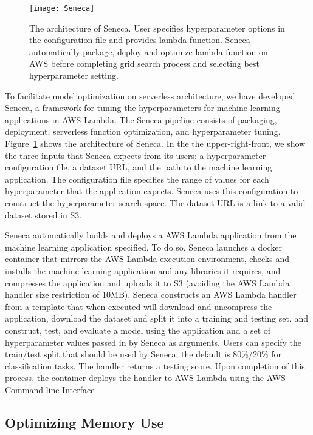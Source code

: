 \begin{figure}[t] \centering 
\texttt{[image: Seneca]}
\caption{The architecture of Seneca. 
User specifies hyperparameter options in the configuration file and provides lambda function. Seneca automatically package, deploy and optimize lambda function on AWS before completing grid search process and selecting best hyperparameter setting.
\label{fig:seneca}}
\end{figure}

To facilitate model optimization on serverless architecture, we have developed Seneca, 
a framework for tuning the hyperparameters for machine learning applications 
in AWS Lambda. 
The Seneca pipeline consists of packaging, deployment, serverless 
function optimization, and hyperparameter tuning. Figure~\ref{fig:seneca} 
shows the architecture of Seneca.  In the the upper-right-front, we
show the three inputs that Seneca expects from its users: a hyperparameter
configuration file, a dataset URL, and the path to 
the machine learning application.
The configuration file
specifies the range of values for each hyperparameter that the 
application expects.  Seneca uses this configuration to construct
the hyperparameter search space.  The dataset URL is a link to a
valid dataset stored in S3.  

Seneca automatically builds and deploys a AWS Lambda application
from the machine learning application specified.
To do so, Seneca launches a docker container that mirrors the
AWS Lambda execution environment, checks and installs
the machine learning application and any libraries it requires,
and compresses the application and uploads it to S3 (avoiding
the AWS Lambda handler size restriction of 10MB).
Seneca constructs an AWS Lambda handler from a template
that when executed will download and uncompress the application,
download the dataset and split it into a training and testing set,
and construct, test, and evaluate a model using the application
and a set of hyperparameter values passed in by Seneca as arguments.
Users can specify the train/test split that should be used by Seneca; the
default is 80\%/20\% for classification tasks.
The handler returns a testing score. 
Upon completion of this process, the container deploys the handler
to AWS Lambda using the
AWS Command line Interface~\cite{ref:awscli}.



\subsection{Optimizing Memory Use}

